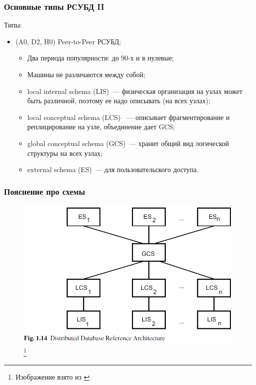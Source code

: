 \documentclass{beamer}
\begin{document}
\begin{frame}
\frametitle{Основные типы РСУБД II}

Типы:
  \begin{itemize}
    \setlength\itemsep{1em}  
    \item (A0, D2, H0) Peer-to-Peer РСУБД;
    \begin{itemize}
      \setlength\itemsep{1em}    
      \item Два периода популярности: до 90-х и в нулевые;
      \item Машины не различаются между собой;
      \item local internal schema (LIS)~--- физическая организация на узлах может быть различной, поэтому ее надо описывать (на всех узлах);
      \item local conceptual schema (LCS) ~--- описывает фрагментирование и реплицирование на узле, объединение дает GCS;      
      \item global conceptual schema (GCS)~--- хранит общий вид логической структуры на всех узлах;
      \item external schema (ES)~--- для пользовательского доступа.
    \end{itemize}

  \end{itemize}

\end{frame}

\begin{frame}
	\frametitle{Пояснение про схемы}
	
	\begin{figure}[htb]
		\includegraphics[width=\textwidth,height=0.80\textheight,keepaspectratio]{ozsu-10.png} 
		\footnote{\tiny{Изображение взято из \cite{Ozsu2011}}}
	\end{figure}
	
\end{frame}
\end{document}
